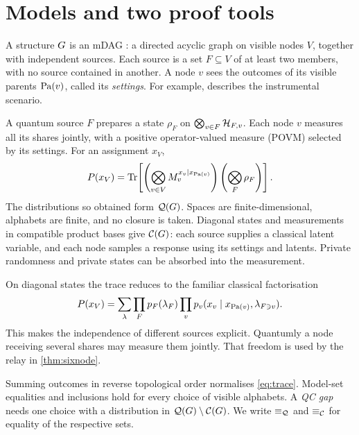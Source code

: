 \section{Models and two proof tools}\label{sec:setting}
A structure $G$ is an mDAG \cite{Evans}: a directed acyclic graph on visible nodes $V$, together with
independent sources. Each source is a set $F\subseteq V$ of at least two members, with no source contained in another. A node $v$ sees the
outcomes of its visible parents $\mathrm{Pa}(v)$, called its \emph{settings}. For example,
 describes the instrumental scenario.

\begin{definition}\label{def:model}
A quantum source $F$ prepares a state $\rho_F$ on $\bigotimes_{v\in F}\mathcal{H}_{F,v}$. Each node $v$
measures all its shares jointly, with a positive operator-valued measure (POVM) selected by its settings. For an assignment $x_V$,
\begin{equation}\label{eq:trace}
P(x_V)=\operatorname{Tr}\!\left[\left(\bigotimes_{v\in V}M_v^{x_v\mid x_{\mathrm{Pa}(v)}}\right)
                           \left(\bigotimes_F\rho_F\right)\right].
\end{equation}
The distributions so obtained form $\mathcal{Q}(G)$. Spaces are finite-dimensional, alphabets are finite, and
no closure is taken. Diagonal states and measurements in compatible product bases give $\mathcal{C}(G)$:
each source supplies a classical latent variable, and each node samples a response using its settings
and latents. Private randomness and private states can be absorbed into the measurement.
\end{definition}
On diagonal states the trace reduces to the familiar classical factorisation
\[
 P(x_V)=\sum_{\lambda}\prod_F p_F(\lambda_F)
              \prod_v p_v(x_v\mid x_{\mathrm{Pa}(v)},\lambda_{F\ni v}).
\]
This makes the independence of different sources explicit. Quantumly a node receiving several
shares may measure them jointly. That freedom is used by the relay in \cref{thm:sixnode}.

Summing outcomes in reverse topological order normalises \cref{eq:trace}. Model-set equalities and
inclusions hold for every choice of visible alphabets. A \emph{QC gap} needs one choice with a
distribution in $\mathcal{Q}(G)\setminus\mathcal{C}(G)$. We write $\equiv_{\mathcal{Q}}$ and $\equiv_{\mathcal{C}}$ for equality of the respective sets.

